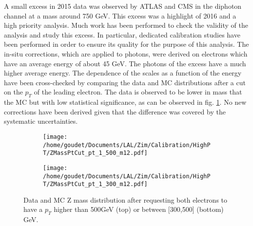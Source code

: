 A small excess in 2015 data was observed by ATLAS \cite{ATLAS-CONF-2015-081} and CMS \cite{CMS-PAS-EXO-15-004} in the diphoton channel at a mass around 750 GeV.
This excess was a highlight of 2016 and a high priority analysis.
Much work has been performed to check the validity of the analysis and study this excess.
In particular, dedicated calibration studies have been performed in order to ensure its quality for the purpose of this analysis.
The in-situ corrections, which are applied to photons, were derived on electrons which have an average energy of about 45 GeV.
The photons of the excess have a much higher average energy.
The dependence of the scales as a function of the energy have been cross-checked by comparing the data and MC distributions after a cut on the $p_T$ of the leading electron.
The data is observed to be lower in mass that the MC but with low statistical significance, as can be observed in fig. \ref{orgc498604}.
No new corrections have been derived given that the difference was covered by the systematic uncertainties.

\begin{figure}
\begin{subfigure}[t]{\linewidth}
\begin{center}
\texttt{[image: /home/goudet/Documents/LAL/Zim/Calibration/HighPT/ZMassPtCut\_pt\_1\_500\_m12.pdf]}
\end{center}
\end{subfigure}
\begin{subfigure}[t]{\linewidth}
\begin{center}
\texttt{[image: /home/goudet/Documents/LAL/Zim/Calibration/HighPT/ZMassPtCut\_pt\_1\_300\_m12.pdf]}
\end{center}
\end{subfigure}
\caption{\label{orgc498604}
Data and MC Z mass distribution after requesting both electrons to have a $p_T$ higher than 500GeV (top) or between [300,500] (bottom) GeV.}
\end{figure}

